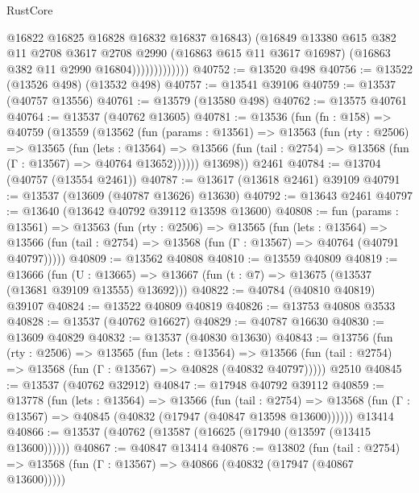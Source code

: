 \begin{lexlean}{RustCore}
\begin{coremodule}
                            @16822
                            @16825
                            @16828
                            @16832
                            @16837
                            @16843)
                          (@16849
                            @13380
                            @615
                            @382
                            @11
                            @2708
                            @3617
                            @2708
                            @2990
                            (@16863 @615 @11 @3617 @16987)
                            (@16863 @382 @11 @2990 @16804)))))))))))))
@40752 := @13520 @498
@40756 := @13522 (@13526 @498) (@13532 @498)
@40757 := @13541 @39106
@40759 := @13537 (@40757 @13556)
@40761 := @13579 (@13580 @498)
@40762 := @13575 @40761
@40764 := @13537 (@40762 @13605)
@40781 := @13536
    (fun (fn : @158) =>
    @40759
      (@13559
        (@13562
          (fun (params : @13561) =>
          @13563
            (fun (rty : @2506) =>
            @13565
              (fun (lets : @13564) =>
              @13566 (fun (tail : @2754) => @13568 (fun (Γ : @13567) => @40764 @13652))))))
        @13698))
    @2461
@40784 := @13704 (@40757 (@13554 @2461))
@40787 := @13617 (@13618 @2461) @39109
@40791 := @13537 (@13609 (@40787 @13626) @13630)
@40792 := @13643 @2461
@40797 := @13640 (@13642 @40792 @39112 @13598 @13600)
@40808 := fun (params : @13561) =>
  @13563
    (fun (rty : @2506) =>
    @13565
      (fun (lets : @13564) =>
      @13566 (fun (tail : @2754) => @13568 (fun (Γ : @13567) => @40764 (@40791 @40797)))))
@40809 := @13562 @40808
@40810 := @13559 @40809
@40819 := @13666
    (fun (U : @13665) => @13667 (fun (t : @7) => @13675 (@13537 (@13681 @39109 @13555) @13692)))
@40822 := @40784 (@40810 @40819) @39107
@40824 := @13522 @40809 @40819
@40826 := @13753 @40808 @3533
@40828 := @13537 (@40762 @16627)
@40829 := @40787 @16630
@40830 := @13609 @40829
@40832 := @13537 (@40830 @13630)
@40843 := @13756
    (fun (rty : @2506) =>
    @13565
      (fun (lets : @13564) =>
      @13566 (fun (tail : @2754) => @13568 (fun (Γ : @13567) => @40828 (@40832 @40797)))))
    @2510
@40845 := @13537 (@40762 @32912)
@40847 := @17948 @40792 @39112
@40859 := @13778
    (fun (lets : @13564) =>
    @13566
      (fun (tail : @2754) =>
      @13568 (fun (Γ : @13567) => @40845 (@40832 (@17947 (@40847 @13598 @13600))))))
    @13414
@40866 := @13537 (@40762 (@13587 (@16625 (@17940 (@13597 (@13415 @13600))))))
@40867 := @40847 @13414
@40876 := @13802
    (fun (tail : @2754) => @13568 (fun (Γ : @13567) => @40866 (@40832 (@17947 (@40867 @13600)))))

\end{coremodule}
\end{lexlean}
